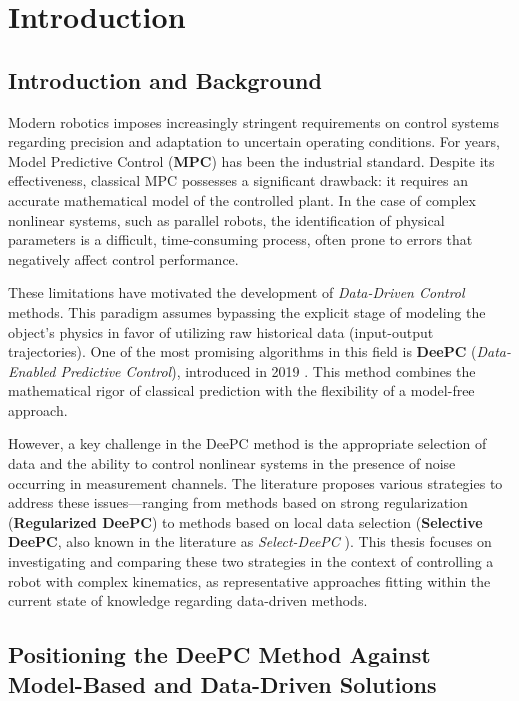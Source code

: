 \chapter{Introduction}
\label{ch:wstep}

\section{Introduction and Background}

Modern robotics imposes increasingly stringent requirements on control systems regarding precision and adaptation to uncertain operating conditions. For years, Model Predictive Control (\textbf{MPC}) has been the industrial standard. Despite its effectiveness, classical MPC possesses a significant drawback: it requires an accurate mathematical model of the controlled plant. In the case of complex nonlinear systems, such as parallel robots, the identification of physical parameters is a difficult, time-consuming process, often prone to errors that negatively affect control performance.

These limitations have motivated the development of \textit{Data-Driven Control} methods. This paradigm assumes bypassing the explicit stage of modeling the object's physics in favor of utilizing raw historical data (input-output trajectories). One of the most promising algorithms in this field is \textbf{DeePC} (\textit{Data-Enabled Predictive Control}), introduced in 2019 \cite{deepc}. This method combines the mathematical rigor of classical prediction with the flexibility of a model-free approach.

However, a key challenge in the DeePC method is the appropriate selection of data and the ability to control nonlinear systems in the presence of noise occurring in measurement channels. The literature proposes various strategies to address these issues—ranging from methods based on strong regularization (\textbf{Regularized DeePC}) to methods based on local data selection (\textbf{Selective DeePC}, also known in the literature as \textit{Select-DeePC} \cite{choosewisely}). This thesis focuses on investigating and comparing these two strategies in the context of controlling a robot with complex kinematics, as representative approaches fitting within the current state of knowledge regarding data-driven methods.

\section{Positioning the DeePC Method Against Model-Based and Data-Driven Solutions}

